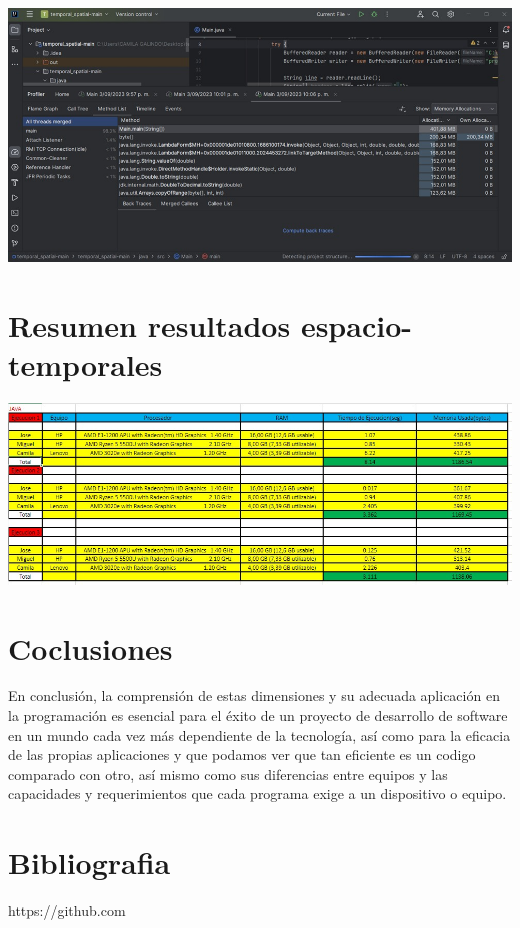 \documentclass[a4paper,twocolumn,10pt]{article}
\begin{document}
\includegraphics[width=0.9\linewidth]{Lenovo AMD 3020e/Method List Memory Allocation 3.jpeg}\\

\section{Resumen resultados espacio-temporales}

\includegraphics[width=1\linewidth]{Resultados finales.jpeg}

\section{Coclusiones}

En conclusión, la comprensión de estas dimensiones y su adecuada aplicación en la programación es esencial para el éxito de un proyecto de desarrollo de software en un mundo cada vez más dependiente de la tecnología, así como para la eficacia de las propias aplicaciones y que podamos ver que tan eficiente es un codigo comparado con otro, así mismo como sus diferencias entre equipos y las capacidades y requerimientos que cada programa exige a un dispositivo o equipo.

\section{Bibliografia}

\item https://github.com
\end{document}
